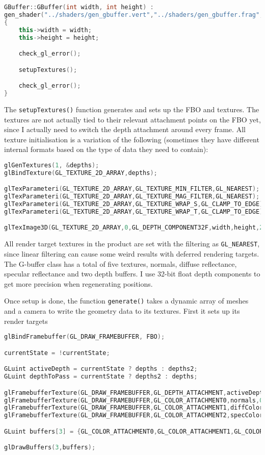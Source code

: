 \begin{lstlisting}[caption={GBuffer.cpp},language=c++]
GBuffer::GBuffer(int width, int height) :
gen_shader("../shaders/gen_gbuffer.vert","../shaders/gen_gbuffer.frag","../shaders/gen_gbuffer.geom")
{
	this->width = width;
	this->height = height;

	check_gl_error();

	setupTextures();

	check_gl_error();
}
\end{lstlisting}

The \verb=setupTextures()= function generates and sets up the FBO and textures. The textures are not actually tied to their relevant attachment points on the FBO yet, since I actually need to switch the depth attachment around every frame.
All texture initialisation is a variation of the following (sometimes they have different internal formats based on the type of data they need to contain):

\begin{lstlisting}[caption={GBuffer.cpp},language=c++]
glGenTextures(1, &depths);
glBindTexture(GL_TEXTURE_2D_ARRAY,depths);

glTexParameteri(GL_TEXTURE_2D_ARRAY,GL_TEXTURE_MIN_FILTER,GL_NEAREST);
glTexParameteri(GL_TEXTURE_2D_ARRAY,GL_TEXTURE_MAG_FILTER,GL_NEAREST);
glTexParameteri(GL_TEXTURE_2D_ARRAY,GL_TEXTURE_WRAP_S,GL_CLAMP_TO_EDGE);
glTexParameteri(GL_TEXTURE_2D_ARRAY,GL_TEXTURE_WRAP_T,GL_CLAMP_TO_EDGE);

glTexImage3D(GL_TEXTURE_2D_ARRAY,0,GL_DEPTH_COMPONENT32F,width,height,2,0,GL_DEPTH_COMPONENT,GL_FLOAT,0);
\end{lstlisting}

All render target textures in the product are set with the filtering as \verb=GL_NEAREST=, since linear filtering can cause some weird results with deferred rendering targets. The G-buffer class has a total of five textures, normals, diffuse reflectance, specular reflectance and two depth buffers. I use 32-bit float depth components to get more precision when regenerating positions.

Once setup is done, the function \verb=generate()= takes a dynamic array of meshes and a camera to write the geometry data to its textures. First it sets up its render targets

\begin{lstlisting}[caption={GBuffer.cpp},language=c++]
glBindFramebuffer(GL_DRAW_FRAMEBUFFER, FBO);

currentState = !currentState;

GLuint activeDepth = currentState ? depths : depths2;
GLuint depthToPass = currentState ? depths2 : depths;

glFramebufferTexture(GL_DRAW_FRAMEBUFFER,GL_DEPTH_ATTACHMENT,activeDepth,0);
glFramebufferTexture(GL_DRAW_FRAMEBUFFER,GL_COLOR_ATTACHMENT0,normals,0);
glFramebufferTexture(GL_DRAW_FRAMEBUFFER,GL_COLOR_ATTACHMENT1,diffColors,0);
glFramebufferTexture(GL_DRAW_FRAMEBUFFER,GL_COLOR_ATTACHMENT2,specColors,0);

GLuint buffers[3] = {GL_COLOR_ATTACHMENT0,GL_COLOR_ATTACHMENT1,GL_COLOR_ATTACHMENT2};

glDrawBuffers(3,buffers);
\end{lstlisting}

